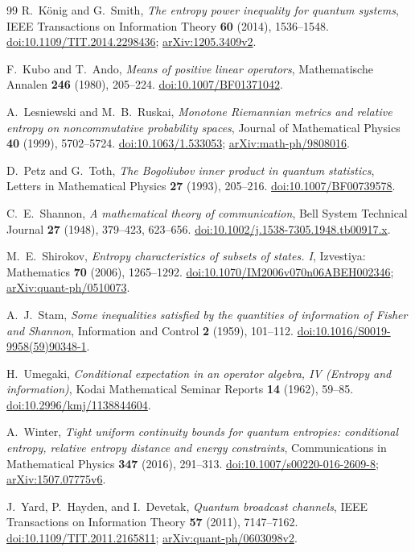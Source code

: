 \begin{thebibliography}{99}
R.~K\"onig and G.~Smith,
\emph{The entropy power inequality for quantum systems},
IEEE Transactions on Information Theory \textbf{60} (2014), 1536--1548.
\href{https://doi.org/10.1109/TIT.2014.2298436}{doi:10.1109/TIT.2014.2298436};
\href{https://arxiv.org/abs/1205.3409v2}{arXiv:1205.3409v2}.

F.~Kubo and T.~Ando,
\emph{Means of positive linear operators},
Mathematische Annalen \textbf{246} (1980), 205--224.
\href{https://doi.org/10.1007/BF01371042}{doi:10.1007/BF01371042}.

A.~Lesniewski and M.~B.~Ruskai,
\emph{Monotone Riemannian metrics and relative entropy on noncommutative probability spaces},
Journal of Mathematical Physics \textbf{40} (1999), 5702--5724.
\href{https://doi.org/10.1063/1.533053}{doi:10.1063/1.533053};
\href{https://arxiv.org/abs/math-ph/9808016}{arXiv:math-ph/9808016}.

D.~Petz and G.~Toth,
\emph{The Bogoliubov inner product in quantum statistics},
Letters in Mathematical Physics \textbf{27} (1993), 205--216.
\href{https://doi.org/10.1007/BF00739578}{doi:10.1007/BF00739578}.

C.~E.~Shannon,
\emph{A mathematical theory of communication},
Bell System Technical Journal \textbf{27} (1948), 379--423, 623--656.
\href{https://doi.org/10.1002/j.1538-7305.1948.tb00917.x}{doi:10.1002/j.1538-7305.1948.tb00917.x}.

M.~E.~Shirokov,
\emph{Entropy characteristics of subsets of states. I},
Izvestiya: Mathematics \textbf{70} (2006), 1265--1292.
\href{https://doi.org/10.1070/IM2006v070n06ABEH002346}{doi:10.1070/IM2006v070n06ABEH002346};
\href{https://arxiv.org/abs/quant-ph/0510073}{arXiv:quant-ph/0510073}.

A.~J.~Stam,
\emph{Some inequalities satisfied by the quantities of information of Fisher and Shannon},
Information and Control \textbf{2} (1959), 101--112.
\href{https://doi.org/10.1016/S0019-9958(59)90348-1}{doi:10.1016/S0019-9958(59)90348-1}.

H.~Umegaki,
\emph{Conditional expectation in an operator algebra, IV (Entropy and information)},
Kodai Mathematical Seminar Reports \textbf{14} (1962), 59--85.
\href{https://doi.org/10.2996/kmj/1138844604}{doi:10.2996/kmj/1138844604}.

A.~Winter,
\emph{Tight uniform continuity bounds for quantum entropies: conditional entropy, relative entropy distance and energy constraints},
Communications in Mathematical Physics \textbf{347} (2016), 291--313.
\href{https://doi.org/10.1007/s00220-016-2609-8}{doi:10.1007/s00220-016-2609-8};
\href{https://arxiv.org/abs/1507.07775v6}{arXiv:1507.07775v6}.

J.~Yard, P.~Hayden, and I.~Devetak,
\emph{Quantum broadcast channels},
IEEE Transactions on Information Theory \textbf{57} (2011), 7147--7162.
\href{https://doi.org/10.1109/TIT.2011.2165811}{doi:10.1109/TIT.2011.2165811};
\href{https://arxiv.org/abs/quant-ph/0603098v2}{arXiv:quant-ph/0603098v2}.
\end{thebibliography}
